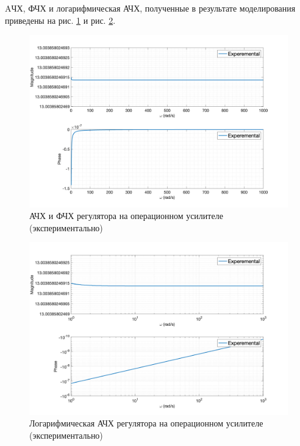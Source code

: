 AЧХ, ФЧХ и логарифмическая АЧХ, полученные в результате моделирования приведены на рис. \ref{fig:task5_freq_resp_exp_lin} и рис. \ref{fig:task5_freq_resp_exp_loglog}.
\begin{figure}[ht!]
    \centering
    \includegraphics[width=\textwidth]{media/plots/task5_freq_resp_exp_lin.png}
    \caption{АЧХ и ФЧХ регулятора на операционном усилителе (экспериментально)}
    \label{fig:task5_freq_resp_exp_lin}
\end{figure}
\begin{figure}[ht!]
    \centering
    \includegraphics[width=\textwidth]{media/plots/task5_freq_resp_exp_loglog.png}
    \caption{Логарифмическая АЧХ регулятора на операционном усилителе (экспериментально)}
    \label{fig:task5_freq_resp_exp_loglog}
\end{figure}

